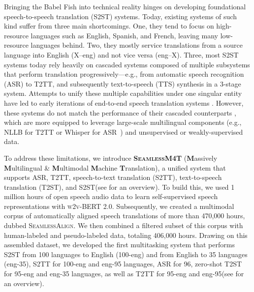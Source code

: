 \documentclass[twoside,11pt]{article}
\newcommand{\mineddata}{\textsc{SeamlessAlign}\xspace}
\newcommand{\mfourt}{\textsc{SeamlessM4T}\xspace}
\newcommand{\ntextlangs}{95\xspace}
\newcommand{\nasrlangs}{96\xspace}
\newcommand{\nsslangs}{100\xspace}
\newcommand{\ntslangs}{35\xspace}
\newcommand{\mt}{{T2TT}\xspace}
\newcommand{\asr}{{ASR}\xspace}
\newcommand{\st}{{S2TT}\xspace}
\newcommand{\sst}{{S2ST}\xspace}
\newcommand{\ttst}{{T2ST}\xspace}
\newcommand{\xeng}{{X--eng}\xspace}
\newcommand{\engx}{{eng--X}\xspace}
\newcommand{\wvbert}{\textsc{w2v-BERT 2.0}\xspace}
\newcommand{\totalminedhours}{470,000\xspace}
\begin{document}
Bringing the Babel Fish into technical reality hinges on developing foundational speech-to-speech translation (\sst) systems.
Today, existing systems of such kind suffer from three main shortcomings. 
One, they tend to focus on high-resource languages such as English, Spanish, and French, leaving many low-resource languages behind. 
Two, they mostly service translations from a source language into English (\xeng) and not vice versa (\engx). 
Three, most \sst systems today rely heavily on cascaded systems composed of multiple subsystems that perform translation progressively—e.g., from automatic speech recognition (\asr) to \mt, and subsequently text-to-speech (TTS) synthesis in a 3-stage system.
Attempts to unify these multiple capabilities under one singular entity have led to early iterations of end-to-end speech translation systems \citep{Lavie1997JanusIIIST,jia:interspeech:2019,lee-etal-2022-direct}. 
However, these systems do not match the performance of their cascaded counterparts \citep{agrawal-etal-2023-findings}, which are more equipped to leverage large-scale multilingual components (e.g., NLLB for \mt or Whisper for \asr~\citep{whisper}) and unsupervised or weakly-supervised data.

To address these limitations, we introduce \textbf{\mfourt} (\textbf{M}assively \textbf{M}ultilingual \& \textbf{M}ultimodal \textbf{M}achine \textbf{T}ranslation), a unified system that supports 
\asr, 
\mt, 
speech-to-text translation (\st), 
text-to-speech translation (\ttst),
and \sst (see  for an overview). 
To build this, we used 1 million hours of open speech audio data to learn self-supervised speech representations with \wvbert.
Subsequently, we created a multimodal corpus of automatically aligned speech translations of more than \totalminedhours hours, dubbed \mineddata.
We then combined a filtered subset of this corpus with human-labeled and pseudo-labeled data, totaling 406,000 hours.
Drawing on this assembled dataset, we developed the first multitasking system that performs 
\sst from \nsslangs languages to English (\nsslangs-eng) and from English to \ntslangs languages (eng-\ntslangs), 
\st for \nsslangs-eng and eng-\ntextlangs languages, 
\asr for \nasrlangs,
zero-shot \ttst for \ntextlangs-eng and eng-\ntslangs languages,
as well as T2TT for \ntextlangs-eng and eng-\ntextlangs (see  for an overview). 



\end{document}
